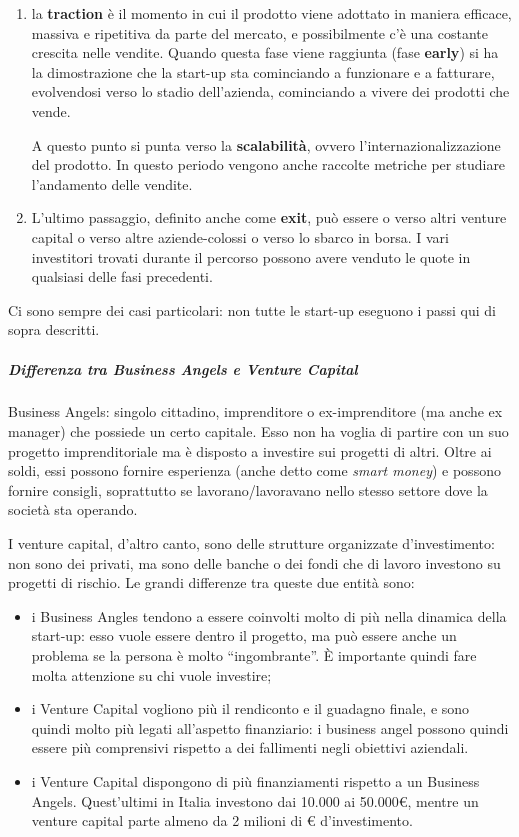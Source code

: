 \begin{enumerate}
 \item la \textbf{traction} è il momento in cui il prodotto viene adottato in
 maniera efficace, massiva e ripetitiva da parte del mercato, e possibilmente
 c'è una costante crescita nelle vendite. Quando questa fase viene raggiunta 
 (fase \textbf{early}) si ha la dimostrazione che la start-up sta cominciando a
 funzionare e a fatturare, evolvendosi verso lo stadio dell'azienda,
 cominciando a vivere dei prodotti che vende.

 A questo punto si punta verso la \textbf{scalabilità}, ovvero
 l'internazionalizzazione del prodotto. In questo periodo vengono anche raccolte
 metriche per studiare l'andamento delle vendite.

 \item L'ultimo passaggio, definito anche come \textbf{exit}, può essere o
 verso altri venture capital o verso altre aziende-colossi o verso lo sbarco in
 borsa. I vari investitori trovati durante il percorso possono avere
 venduto le quote in qualsiasi delle fasi precedenti.

\end{enumerate}

Ci sono sempre dei casi particolari: non tutte le start-up eseguono i passi qui
di sopra descritti.

\subparagraph*{Differenza tra Business Angels e Venture Capital}
\label{startup:crearestartup:bavsvc}
Business Angels: singolo cittadino, imprenditore o ex-imprenditore (ma anche ex
manager) che possiede un certo capitale. Esso non ha voglia di partire con un
suo progetto imprenditoriale ma è disposto a investire sui progetti di altri.
Oltre ai soldi, essi possono fornire esperienza (anche detto come \textit{smart
money}) e possono fornire consigli, soprattutto se lavorano/lavoravano nello
stesso settore dove la società sta operando.

I venture capital, d'altro canto, sono delle strutture organizzate
d'investimento: non sono dei privati, ma sono delle banche o dei fondi che di
lavoro investono su progetti di rischio. Le grandi differenze tra queste due
entità sono:
\begin{itemize}
 \item i Business Angles tendono a essere coinvolti molto di più nella dinamica
della start-up: esso vuole essere dentro il progetto, ma può essere anche un
problema se la persona è molto ``ingombrante''. È importante quindi fare molta
attenzione su chi vuole investire;
 \item i Venture Capital vogliono più il rendiconto e il guadagno finale, e
 sono quindi molto più legati all'aspetto finanziario: i business angel possono
 quindi essere più comprensivi rispetto a dei fallimenti negli obiettivi
 aziendali.
 \item i Venture Capital dispongono di più finanziamenti rispetto a un
 Business Angels. Quest'ultimi in Italia investono dai 10.000 ai
 50.000\euro{}, mentre un venture capital parte almeno da 2 milioni di \euro{}
 d'investimento.
\end{itemize}

